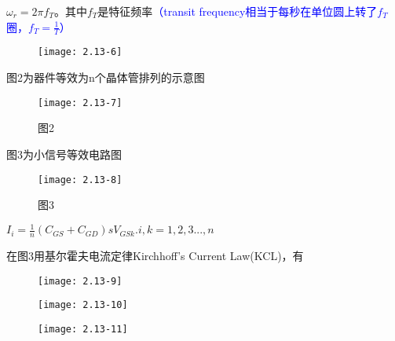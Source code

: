 ${\omega}_r=2\pi f_T$。其中$f_T$是特征频率\textcolor{blue}{（transit frequency相当于每秒在单位圆上转了$f_T$圈，$f_T=\frac{1}{T}$）}

\begin{figure}[H] %
	\begin{minipage}{\linewidth}
		\texttt{[image: 2.13-6]}
	\end{minipage}
\end{figure}

\scalebox{3}{（b）}

图2为器件等效为n个晶体管排列的示意图


\begin{figure}[H] %
	\begin{minipage}{\linewidth}
		\texttt{[image: 2.13-7]}
	\end{minipage}
	\caption*{图2} %
\end{figure}

图3为小信号等效电路图

\begin{figure}[H] %
	\begin{minipage}{\linewidth}
		\texttt{[image: 2.13-8]}
	\end{minipage}
	\caption*{图3} %
\end{figure}

$I_i=\frac{1}{n}(C_{GS}+C_{GD})sV_{GSk}.i,k=1,2,3...,n$

在图3用基尔霍夫电流定律Kirchhoff’s Current Law(KCL)，有

\begin{figure}[H] %
	\begin{minipage}{\linewidth}
		\texttt{[image: 2.13-9]}
	\end{minipage}
\end{figure}

\begin{figure}[H] %
	\begin{minipage}{\linewidth}
		\texttt{[image: 2.13-10]}
	\end{minipage}
\end{figure}

\begin{figure}[H] %
	\begin{minipage}{\linewidth}
		\texttt{[image: 2.13-11]}
	\end{minipage}
\end{figure}









